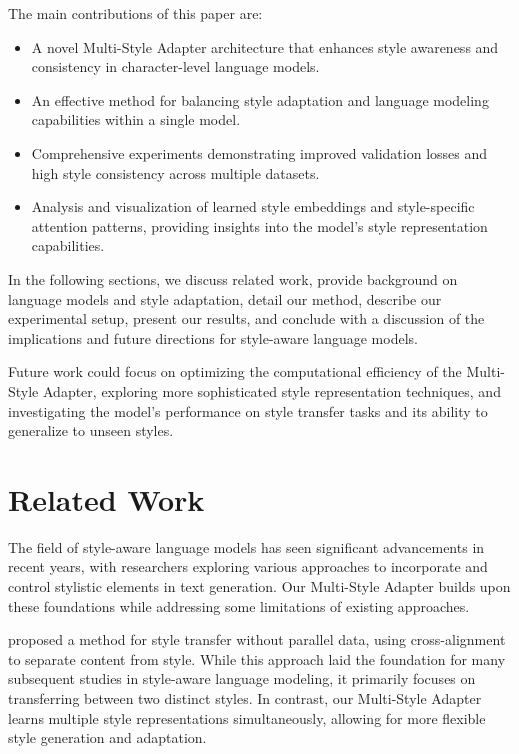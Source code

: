 \documentclass{article} %
\begin{document}
The main contributions of this paper are:

\begin{itemize}
    \item A novel Multi-Style Adapter architecture that enhances style awareness and consistency in character-level language models.
    \item An effective method for balancing style adaptation and language modeling capabilities within a single model.
    \item Comprehensive experiments demonstrating improved validation losses and high style consistency across multiple datasets.
    \item Analysis and visualization of learned style embeddings and style-specific attention patterns, providing insights into the model's style representation capabilities.
\end{itemize}

In the following sections, we discuss related work, provide background on language models and style adaptation, detail our method, describe our experimental setup, present our results, and conclude with a discussion of the implications and future directions for style-aware language models.

Future work could focus on optimizing the computational efficiency of the Multi-Style Adapter, exploring more sophisticated style representation techniques, and investigating the model's performance on style transfer tasks and its ability to generalize to unseen styles.

\section{Related Work}
\label{sec:related}

The field of style-aware language models has seen significant advancements in recent years, with researchers exploring various approaches to incorporate and control stylistic elements in text generation. Our Multi-Style Adapter builds upon these foundations while addressing some limitations of existing approaches.

\citet{Shen2017StyleTF} proposed a method for style transfer without parallel data, using cross-alignment to separate content from style. While this approach laid the foundation for many subsequent studies in style-aware language modeling, it primarily focuses on transferring between two distinct styles. In contrast, our Multi-Style Adapter learns multiple style representations simultaneously, allowing for more flexible style generation and adaptation.
\end{document}
